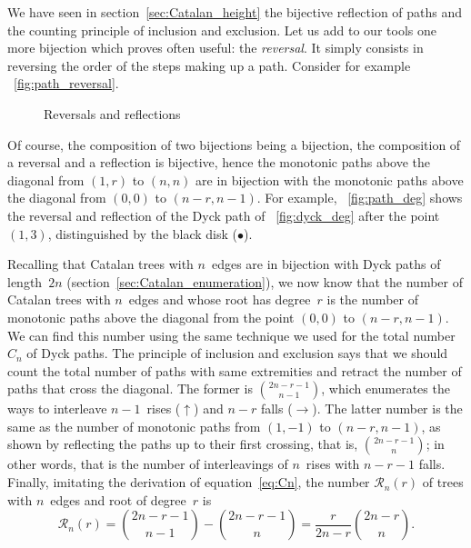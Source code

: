 We have seen in section~\vref{sec:Catalan_height} the bijective
reflection of paths and the counting principle of inclusion and
exclusion. Let us add to our tools one more bijection which proves
often useful: the \emph{reversal}. It simply consists in reversing the
order of the steps making up a path. Consider for example
\fig~\ref{fig:path_reversal}.
\begin{figure}
\centering
{}
\qquad
{}
\caption{Reversals and reflections}
\end{figure}
Of course, the composition of two bijections being a bijection, the
composition of a reversal and a reflection is bijective, hence the
monotonic paths above the diagonal from \((1,r)\) to \((n,n)\) are in
bijection with the monotonic paths above the diagonal from \((0,0)\)
to \((n-r,n-1)\). For example, \fig~\ref{fig:path_deg} shows the
reversal and reflection of the Dyck path of \fig~\ref{fig:dyck_deg}
after the point \((1,3)\), distinguished by the black disk
(\(\bullet\)).

Recalling that Catalan trees with \(n\)~edges are in bijection with
Dyck paths of length~\(2n\) (section~\vref{sec:Catalan_enumeration}),
we now know that the number of Catalan trees with \(n\)~edges and
whose root has degree~\(r\) is the number of monotonic paths above the
diagonal from the point \((0,0)\) to \((n-r,n-1)\). We can find this
number using the same technique we used for the total number~\(C_n\)
of Dyck paths. The principle of inclusion and exclusion says that we
should count the total number of paths with same extremities and
retract the number of paths that cross the diagonal. The former is
\(\binom{2n-r-1}{n-1}\), which enumerates the ways to interleave
\(n-1\)~rises (\(\uparrow\)) and \(n-r\) falls (\(\rightarrow\)). The
latter number is the same as the number of monotonic paths from
\((1,-1)\) to \((n-r,n-1)\), as shown by reflecting the paths up to
their first crossing, that is, \(\binom{2n-r-1}{n}\); in other words,
that is the number of interleavings of \(n\)~rises with \(n-r-1\)
falls. Finally, imitating the derivation of equation~\eqref{eq:Cn},
the number \(\mathcal{R}_n(r)\) of trees with \(n\)~edges and root of
degree~\(r\) is
\begin{equation*}
\mathcal{R}_n(r) = \binom{2n-r-1}{n-1} - \binom{2n-r-1}{n} 
                 = \frac{r}{2n-r} \binom{2n-r}{n}.
\end{equation*}

